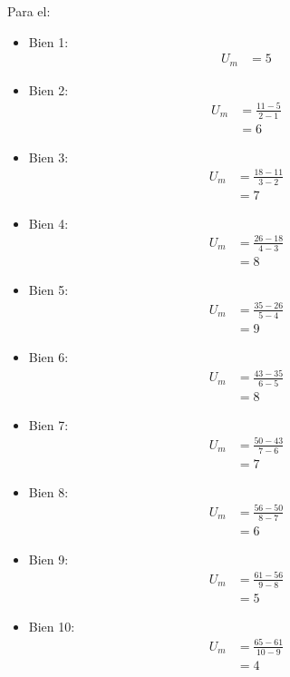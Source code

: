 \documentclass{templateNote}
\begin{document}
Para el:
\begin{itemize}
    \item Bien 1: 
    \begin{align*}
        U_m &= 5
    \end{align*}
    
    \item Bien 2:
    \begin{align*}
        U_m &= \frac{11 - 5}{2 - 1} \\
        &= 6
    \end{align*}
    
    \item Bien 3:
    \begin{align*}
        U_m &= \frac{18 - 11}{3 - 2} \\
        &= 7
    \end{align*}

    \item Bien 4:
    \begin{align*}
        U_m &= \frac{26 - 18}{4 - 3} \\
        &= 8
    \end{align*}

    \item Bien 5:
    \begin{align*}
        U_m &= \frac{35 - 26}{5 - 4} \\
        &= 9
    \end{align*}

    \item Bien 6:
    \begin{align*}
        U_m &= \frac{43 - 35}{6 - 5} \\
        &= 8
    \end{align*}

    \item Bien 7:
    \begin{align*}
        U_m &= \frac{50 - 43}{7 - 6} \\
        &= 7
    \end{align*}

    \item Bien 8:
    \begin{align*}
        U_m &= \frac{56 - 50}{8 - 7} \\
        &= 6
    \end{align*}

    \item Bien 9:
    \begin{align*}
        U_m &= \frac{61 - 56}{9 - 8} \\
        &= 5
    \end{align*}
    
    \item Bien 10:
    \begin{align*}
        U_m &= \frac{65 - 61}{10 - 9} \\
        &= 4
    \end{align*}

\end{itemize}
\end{document}
